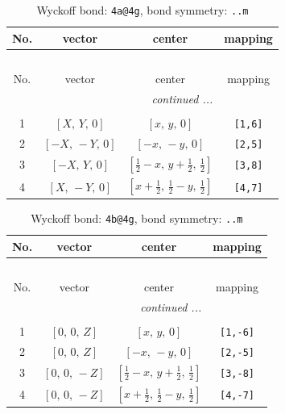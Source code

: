 \documentclass[fleqn,8pt]{jsarticle}
\begin{document}
\begin{longtable}{cccc}
\caption{Wyckoff bond: {\tt 4a@4g}, bond symmetry: {\tt ..m}}
 \\
 \hline \hline
No. & vector & center & mapping \\ \hline \endfirsthead

\multicolumn{3}{l}{\tablename\ \thetable{}} \\
 \hline \hline
No. & vector & center & mapping \\ \hline \endhead

 \hline \hline
\multicolumn{3}{r}{\footnotesize\it continued ...} \\ \endfoot

 \hline \hline
\multicolumn{3}{r}{} \\ \endlastfoot

1 & $\left[ X,\, Y,\, 0 \right]$ & $\left[ x,\, y,\, 0 \right]$ & {\tt [1,6]} \\ \hline
2 & $\left[ - X,\, - Y,\, 0 \right]$ & $\left[ - x,\, - y,\, 0 \right]$ & {\tt [2,5]} \\ \hline
3 & $\left[ - X,\, Y,\, 0 \right]$ & $\left[ \frac{1}{2} - x,\, y + \frac{1}{2},\, \frac{1}{2} \right]$ & {\tt [3,8]} \\ \hline
4 & $\left[ X,\, - Y,\, 0 \right]$ & $\left[ x + \frac{1}{2},\, \frac{1}{2} - y,\, \frac{1}{2} \right]$ & {\tt [4,7]} \\
\end{longtable}
\renewcommand{\arraystretch}{1.2}
\begin{longtable}{cccc}
\caption{Wyckoff bond: {\tt 4b@4g}, bond symmetry: {\tt ..m}}
 \\
 \hline \hline
No. & vector & center & mapping \\ \hline \endfirsthead

\multicolumn{3}{l}{\tablename\ \thetable{}} \\
 \hline \hline
No. & vector & center & mapping \\ \hline \endhead

 \hline \hline
\multicolumn{3}{r}{\footnotesize\it continued ...} \\ \endfoot

 \hline \hline
\multicolumn{3}{r}{} \\ \endlastfoot

1 & $\left[ 0,\, 0,\, Z \right]$ & $\left[ x,\, y,\, 0 \right]$ & {\tt [1,-6]} \\ \hline
2 & $\left[ 0,\, 0,\, Z \right]$ & $\left[ - x,\, - y,\, 0 \right]$ & {\tt [2,-5]} \\ \hline
3 & $\left[ 0,\, 0,\, - Z \right]$ & $\left[ \frac{1}{2} - x,\, y + \frac{1}{2},\, \frac{1}{2} \right]$ & {\tt [3,-8]} \\ \hline
4 & $\left[ 0,\, 0,\, - Z \right]$ & $\left[ x + \frac{1}{2},\, \frac{1}{2} - y,\, \frac{1}{2} \right]$ & {\tt [4,-7]} \\
\end{longtable}
\end{document}
